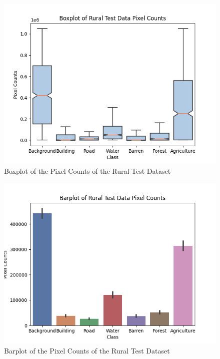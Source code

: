\begin{figure}[!h]
\includegraphics[width=15.0cm, height=8.5cm]{images/rural test boxplot.png}
\centering
\caption{Boxplot of the Pixel Counts of the Rural Test Dataset}
\label{fig:boxplot-rural-test}
\end{figure}

\begin{figure}[!h]
\includegraphics[width=15.0cm, height=8.5cm]{images/rural test barplot.png}
\centering
\caption{Barplot of the Pixel Counts of the Rural Test Dataset}
\label{fig:barplot-rural-test}
\end{figure}


